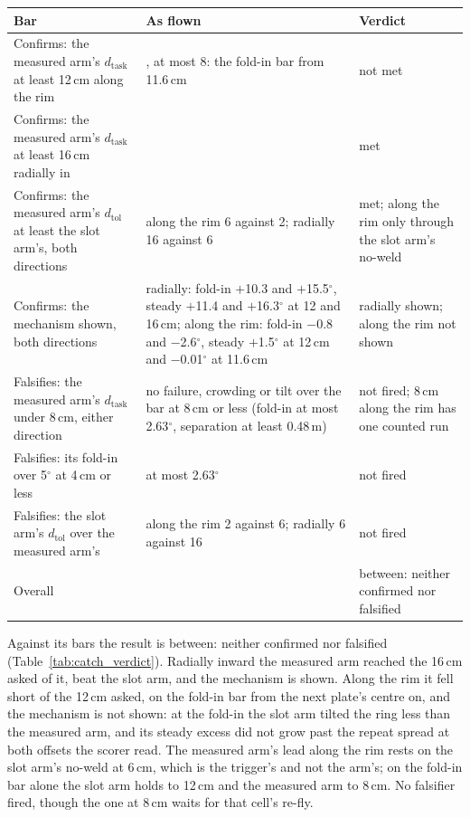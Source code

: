 \begin{table}[htbp]
\vspace{1ex}
\begin{tabularx}{\textwidth}{>{\raggedright\arraybackslash}p{4.3cm}>{\raggedright\arraybackslash}X>{\raggedright\arraybackslash}p{2.6cm}}
\toprule
Bar & As flown & Verdict \\
\midrule
Confirms: the measured arm's $d_\mathrm{task}$ at least 12\,cm along the rim & 6, at most 8: the fold-in bar from 11.6\,cm
  & not met \\
Confirms: the measured arm's $d_\mathrm{task}$ at least 16\,cm radially in & 16 & met \\
Confirms: the measured arm's $d_\mathrm{tol}$ at least the slot arm's, both directions & along the rim 6 against 2;
  radially 16 against 6 & met; along the rim only through the slot arm's no-weld \\
Confirms: the mechanism shown, both directions & radially: fold-in $+$10.3 and $+$15.5$^\circ$, steady $+$11.4 and
  $+$16.3$^\circ$ at 12 and 16\,cm; along the rim: fold-in $-$0.8 and $-$2.6$^\circ$, steady $+$1.5$^\circ$ at 12\,cm and
  $-$0.01$^\circ$ at 11.6\,cm & radially shown; along the rim not shown \\
Falsifies: the measured arm's $d_\mathrm{task}$ under 8\,cm, either direction & no failure, crowding or tilt over the bar
  at 8\,cm or less (fold-in at most 2.63$^\circ$, separation at least 0.48\,m) & not fired; 8\,cm along the rim has one
  counted run \\
Falsifies: its fold-in over 5$^\circ$ at 4\,cm or less & at most 2.63$^\circ$ & not fired \\
Falsifies: the slot arm's $d_\mathrm{tol}$ over the measured arm's & along the rim 2 against 6; radially 6 against 16
  & not fired \\
\midrule
Overall & & between: neither confirmed nor falsified \\
\bottomrule
\end{tabularx}
\end{table}

Against its bars the result is between: neither confirmed nor falsified (Table~\ref{tab:catch_verdict}). Radially
inward the measured arm reached the 16\,cm asked of it, beat the slot arm, and the mechanism is shown. Along the rim it
fell short of the 12\,cm asked, on the fold-in bar from the next plate's centre on, and the mechanism is not shown: at
the fold-in the slot arm tilted the ring less than the measured arm, and its steady excess did not grow past the repeat
spread at both offsets the scorer read. The measured arm's lead along the rim rests on the slot arm's no-weld at 6\,cm,
which is the trigger's and not the arm's; on the fold-in bar alone the slot arm holds to 12\,cm and the measured arm to
8\,cm. No falsifier fired, though the one at 8\,cm waits for that cell's re-fly.

